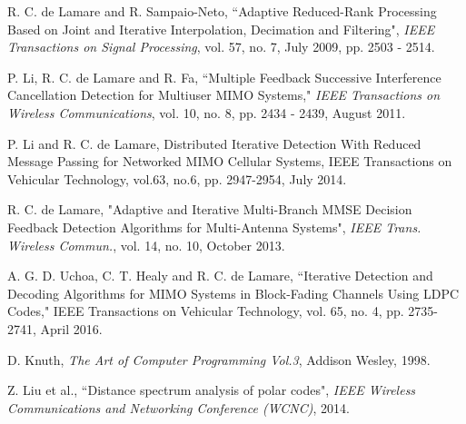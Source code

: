 \documentclass[10pt,twocolumn]{IEEEtran}
\begin{document}
\begin{thebibliography}{99}
R. C. de Lamare and R. Sampaio-Neto, ``Adaptive Reduced-Rank
Processing Based on Joint and Iterative Interpolation, Decimation
and Filtering", \textit{IEEE Transactions on Signal Processing},
vol. 57, no. 7, July 2009, pp. 2503 - 2514.

 P. Li, R. C. de Lamare and R. Fa, ``Multiple
Feedback Successive Interference Cancellation Detection for
Multiuser MIMO Systems," \textit{IEEE Transactions on Wireless
Communications}, vol. 10, no. 8, pp. 2434 - 2439, August 2011.

P. Li and R. C. de Lamare, Distributed Iterative Detection With
Reduced Message Passing for Networked MIMO Cellular Systems, IEEE
Transactions on Vehicular Technology, vol.63, no.6, pp. 2947-2954,
July 2014.

 R.
C. de Lamare, "Adaptive and Iterative Multi-Branch MMSE Decision
Feedback Detection Algorithms for Multi-Antenna Systems", \emph{IEEE
Trans. Wireless Commun.}, vol. 14, no. 10, October 2013.

A. G. D. Uchoa, C. T. Healy and R. C. de Lamare, ``Iterative
Detection and Decoding Algorithms for MIMO Systems in Block-Fading
Channels Using LDPC Codes," IEEE Transactions on Vehicular
Technology, vol. 65, no. 4, pp. 2735-2741, April 2016.



D. Knuth, \textit{The Art of Computer Programming Vol.3},
Addison Wesley, 1998.

Z. Liu et al., ``Distance spectrum analysis of polar codes",
\textit{IEEE Wireless Communications and Networking Conference
(WCNC)}, 2014.

\end{thebibliography}
\end{document}
